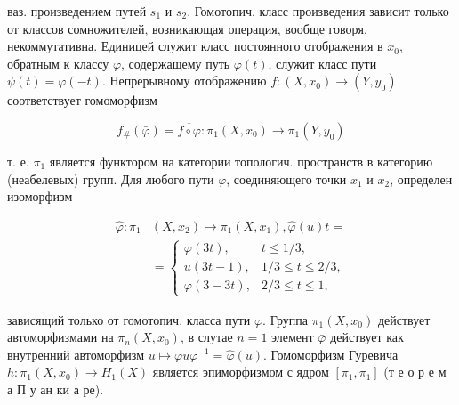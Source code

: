 \documentclass[10pt]{article}
\begin{document}
ваз. произведением путей $s_{1}$ и $s_{2}$. Гомотопич. класс произведения зависит только от классов сомножителей, возникающая операция, вообще говоря, некоммутативна. Единицей служит класс постоянного отображения в $x_{0}$, обратным к классу $\bar{\varphi}$, содержащему путь $\varphi(t)$, служит класс пути $\psi(t)=\varphi(-t)$. Непрерывному отображению $f:\left(X, x_{0}\right) \rightarrow\left(Y, y_{0}\right)$ соответствует гомоморфизм



\[

f_{\#}(\bar{\varphi})=\overline{f \circ \varphi}: \pi_{1}\left(X, x_{0}\right) \longrightarrow \pi_{1}\left(Y, y_{0}\right)

\]



т. е. $\pi_{1}$ является функтором на категории топологич. пространств в категорию (неабелевых) групп. Для любого пути $\varphi$, соединяющего точки $x_{1}$ и $x_{2}$, определен изоморфизм



\[

\begin{aligned}

\hat{\varphi}: \pi_{1} & \left(X, x_{2}\right) \rightarrow \pi_{1}\left(X, x_{1}\right), \hat{\varphi}(u) t= \\

& = \begin{cases}\varphi(3 t), & t \leqslant 1 / 3, \\

u(3 t-1), & 1 / 3 \leqslant t \leqslant 2 / 3, \\

\varphi(3-3 t), & 2 / 3 \leqslant t \leqslant 1,\end{cases}

\end{aligned}

\]



зависящий только от гомотопич. класса пути $\varphi$. Группа $\pi_{1}\left(X, x_{0}\right)$ действует автоморфизмами на $\pi_{n}\left(X, x_{0}\right)$, в слутае $n=1$ элемент $\bar{\varphi}$ действует как внутренний автоморфизм $\bar{u} \mapsto \bar{\varphi} \bar{u} \bar{\varphi}^{-1}=\hat{\varphi}(\bar{u})$. Гомоморфизм Гуревича $h: \pi_{1}\left(X, x_{0}\right) \longrightarrow H_{1}(X)$ является эпиморфизмом с ядром $\left[\pi_{1}, \pi_{1}\right]$ (т е о р е м а П у ан ки а ре).
\end{document}
